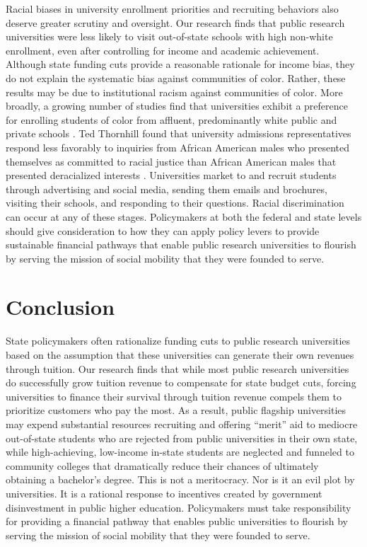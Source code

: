 \documentclass{article}
\begin{document}
Racial biases in university enrollment priorities and recruiting behaviors also deserve greater scrutiny and oversight. Our research finds that public research universities were less likely to visit out-of-state schools with high non-white enrollment, even after controlling for income and academic achievement. Although state funding cuts provide a reasonable rationale for income bias, they do not explain the systematic bias against communities of color. Rather, these results may be due to institutional racism against communities of color. More broadly, a growing number of studies find that universities exhibit a preference for enrolling students of color from affluent, predominantly white public and private schools \citep{RN4495, RN4396, RN2517}. Ted Thornhill found that university admissions representatives respond less favorably to inquiries from African American males who presented themselves as committed to racial justice than African American males that presented deracialized interests \citep{RN4360}. Universities market to and recruit students through advertising and social media, sending them emails and brochures, visiting their schools, and responding to their questions. Racial discrimination can occur at any of these stages. Policymakers at both the federal and state levels should give consideration to how they can apply policy levers to provide sustainable financial pathways that enable public research universities to flourish by serving the mission of social mobility that they were founded to serve.

\section*{Conclusion}

State policymakers often rationalize funding cuts to public research universities based on the assumption that these universities can generate their own revenues through tuition. Our research finds that while most public research universities do successfully grow tuition revenue to compensate for state budget cuts, forcing universities to finance their survival through tuition revenue compels them to prioritize customers who pay the most. As a result, public flagship universities may expend substantial resources recruiting and offering ``merit'' aid to mediocre out-of-state students who are rejected from public universities in their own state, while high-achieving, low-income in-state students are neglected and funneled to community colleges that dramatically reduce their chances of ultimately obtaining a bachelor's degree. This is not a meritocracy. Nor is it an evil plot by universities. It is a rational response to incentives created by government disinvestment in public higher education.  Policymakers must take responsibility for providing a financial pathway that enables public universities to flourish by serving the mission of social mobility that they were founded to serve.
\end{document}

